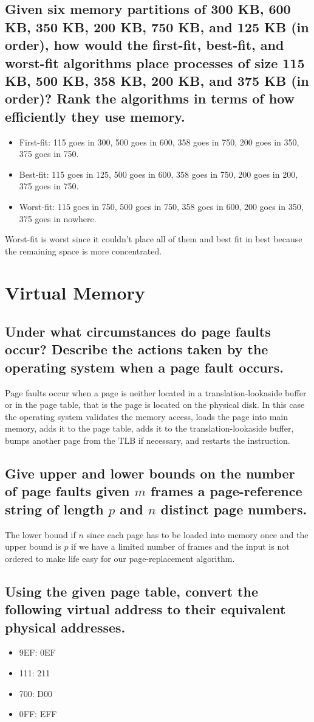 \documentclass{book}%
\begin{document}
\section{Given six memory partitions of 300 KB, 600 KB, 350 KB, 200 KB, 750 KB, and 125 KB (in order), how would the first-fit, best-fit, and worst-fit algorithms place processes of size 115 KB, 500 KB, 358 KB, 200 KB, and 375 KB (in order)? Rank the algorithms in terms of how efficiently they use memory.}
\begin{itemize}
\item First-fit: 115 goes in 300, 500 goes in 600, 358 goes in 750, 200 goes in 350, 375 goes in 750.
\item Best-fit: 115 goes in 125, 500 goes in 600, 358 goes in 750, 200 goes in 200, 375 goes in 750.
\item Worst-fit: 115  goes in 750, 500 goes in 750, 358 goes in 600, 200 goes in 350, 375 goes in nowhere. 
\end{itemize}
Worst-fit is worst since it couldn't place all of them and best fit in best because the remaining space is more concentrated.
\chapter{Virtual Memory}
\section{Under what circumstances do page faults occur? Describe the actions taken by the operating system when a page fault occurs.}
Page faults occur when a page is neither located in a translation-lookaside buffer or in the page table, that is the page is located on the physical disk. In this case the operating system validates the memory access, loads the page into main memory, adds it to the page table, adds it to the translation-lookaside buffer, bumps another page from the TLB if necessary, and restarts the instruction.
\section{Give upper and lower bounds on the number of page faults given $m$ frames a page-reference string of length $p$ and $n$ distinct page numbers.}
The lower bound if $n$ since each page has to be loaded into memory once and the upper bound is $p$ if we have a limited number of frames and the input is not ordered to make life easy for our page-replacement algorithm.
\section{Using the given page table, convert the following virtual address to their equivalent physical addresses.}
\begin{itemize}
\item 9EF: 0EF
\item 111: 211
\item 700: D00
\item 0FF: EFF
\end{itemize}
\end{document}
